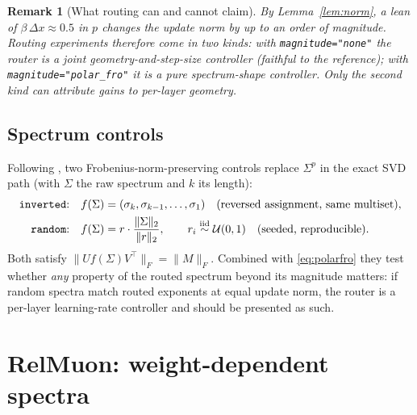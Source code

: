 \documentclass{article}
\newtheorem{remark}{Remark}
\begin{document}
\begin{remark}[What routing can and cannot claim]
By Lemma~\ref{lem:norm}, a lean of $\beta\,\Delta x \approx 0.5$ in $p$
changes the update norm by up to an order of magnitude. Routing experiments
therefore come in two kinds: with \texttt{magnitude="none"} the router is a
\emph{joint} geometry-and-step-size controller (faithful to the reference);
with \texttt{magnitude="polar\_fro"} it is a pure spectrum-shape controller.
Only the second kind can attribute gains to per-layer geometry.
\end{remark}

\subsection{Spectrum controls}
\label{sec:controls}

Following \cite{liu2026notspecial}, two Frobenius-norm-preserving controls
replace $\Sigma^p$ in the exact SVD path (with $\Sigma$ the raw spectrum and
$k$ its length):
\begin{align}
\text{\texttt{inverted}:}\quad & f(\Sigma) = (\sigma_k, \sigma_{k-1}, \dots,
\sigma_1) \quad\text{(reversed assignment, same multiset)},\\
\text{\texttt{random}:}\quad & f(\Sigma) = r \cdot
\frac{\|\Sigma\|_2}{\|r\|_2}, \qquad r_i \overset{\text{iid}}{\sim}
\mathcal{U}(0,1) \quad\text{(seeded, reproducible)}.
\end{align}
Both satisfy $\|U f(\Sigma) V^\top\|_F = \|M\|_F$. Combined with
\eqref{eq:polarfro} they test whether \emph{any} property of the routed
spectrum beyond its magnitude matters: if random spectra match routed
exponents at equal update norm, the router is a per-layer learning-rate
controller and should be presented as such.

\section{RelMuon: weight-dependent spectra}
\label{sec:relmuon}
\end{document}
